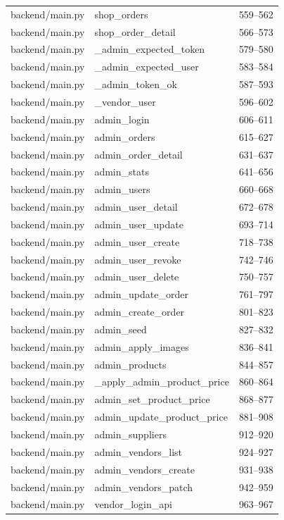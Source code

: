 \begin{center}
\begin{longtable}{@{}p{4.6cm}p{5.2cm}c@{}}
backend/main.py & shop\_orders & 559--562 \\
backend/main.py & shop\_order\_detail & 566--573 \\
backend/main.py & \_admin\_expected\_token & 579--580 \\
backend/main.py & \_admin\_expected\_user & 583--584 \\
backend/main.py & \_admin\_token\_ok & 587--593 \\
backend/main.py & \_vendor\_user & 596--602 \\
backend/main.py & admin\_login & 606--611 \\
backend/main.py & admin\_orders & 615--627 \\
backend/main.py & admin\_order\_detail & 631--637 \\
backend/main.py & admin\_stats & 641--656 \\
backend/main.py & admin\_users & 660--668 \\
backend/main.py & admin\_user\_detail & 672--678 \\
backend/main.py & admin\_user\_update & 693--714 \\
backend/main.py & admin\_user\_create & 718--738 \\
backend/main.py & admin\_user\_revoke & 742--746 \\
backend/main.py & admin\_user\_delete & 750--757 \\
backend/main.py & admin\_update\_order & 761--797 \\
backend/main.py & admin\_create\_order & 801--823 \\
backend/main.py & admin\_seed & 827--832 \\
backend/main.py & admin\_apply\_images & 836--841 \\
backend/main.py & admin\_products & 844--857 \\
backend/main.py & \_apply\_admin\_product\_price & 860--864 \\
backend/main.py & admin\_set\_product\_price & 868--877 \\
backend/main.py & admin\_update\_product\_price & 881--908 \\
backend/main.py & admin\_suppliers & 912--920 \\
backend/main.py & admin\_vendors\_list & 924--927 \\
backend/main.py & admin\_vendors\_create & 931--938 \\
backend/main.py & admin\_vendors\_patch & 942--959 \\
backend/main.py & vendor\_login\_api & 963--967 \\

\end{longtable}
\end{center}
